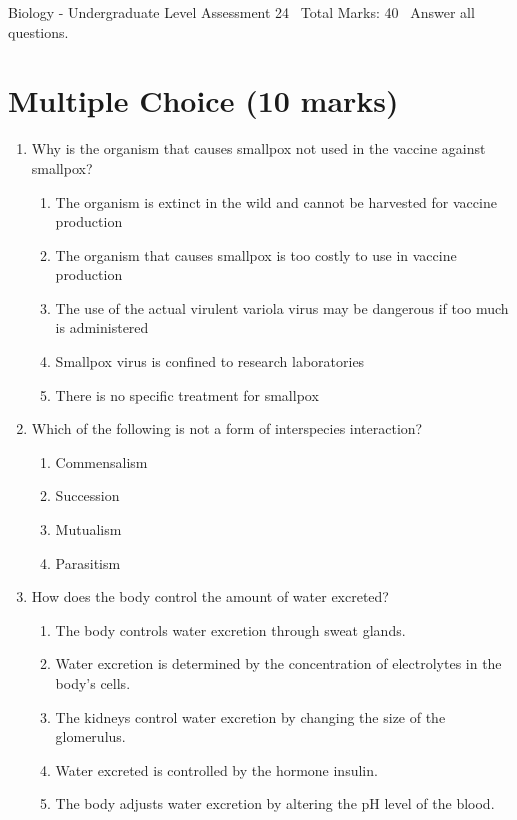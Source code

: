 \documentclass[12pt]{article}
\begin{document}
\begin{center}
Biology - Undergraduate Level Assessment 24 \
Total Marks: 40 \
Answer all questions.
\end{center}

\section*{Multiple Choice (10 marks)}
\begin{enumerate}[label=\arabic*.]
\item Why is the organism that causes smallpox not used in the vaccine against smallpox?
\begin{enumerate}[label=(\alph*)]
    \item The organism is extinct in the wild and cannot be harvested for vaccine production
    \item The organism that causes smallpox is too costly to use in vaccine production
    \item The use of the actual virulent variola virus may be dangerous if too much is administered
    \item Smallpox virus is confined to research laboratories
    \item There is no specific treatment for smallpox
\end{enumerate}
\item Which of the following is not a form of interspecies interaction?
\begin{enumerate}[label=(\alph*)]
    \item Commensalism
    \item Succession
    \item Mutualism
    \item Parasitism
\end{enumerate}
\item How does the body control the amount of water excreted?
\begin{enumerate}[label=(\alph*)]
    \item The body controls water excretion through sweat glands.
    \item Water excretion is determined by the concentration of electrolytes in the body's cells.
    \item The kidneys control water excretion by changing the size of the glomerulus.
    \item Water excreted is controlled by the hormone insulin.
    \item The body adjusts water excretion by altering the pH level of the blood.

\end{enumerate}
\end{enumerate}
\end{document}
